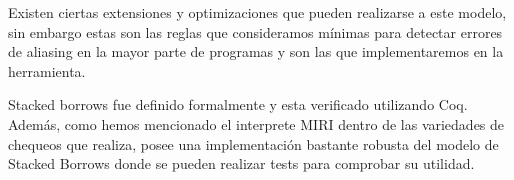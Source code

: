 Existen ciertas extensiones y optimizaciones que pueden realizarse a este modelo, sin embargo estas son las reglas que consideramos mínimas para detectar errores de aliasing en la mayor parte de programas y son las que implementaremos en la herramienta.

Stacked borrows fue definido formalmente y esta verificado utilizando Coq. Además, como hemos mencionado el interprete MIRI \cite{miri} dentro de las variedades de chequeos que realiza, posee una implementación bastante robusta del modelo de Stacked Borrows donde se pueden realizar tests para comprobar su utilidad.